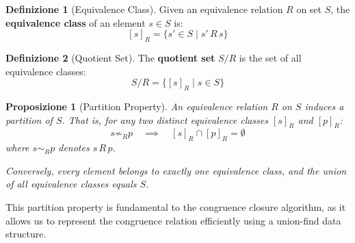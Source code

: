 \documentclass[11pt,a4paper]{article}
\theoremstyle{definition}
\newtheorem{definition}{Definizione}[section]
\theoremstyle{plain}
\newtheorem{proposition}[theorem]{Proposizione}
\theoremstyle{remark}
\begin{document}
\begin{definition}[Equivalence Class]
Given an equivalence relation $R$ on set $S$, the \textbf{equivalence class} of an element $s \in S$ is:
\[
[s]_R = \{s' \in S \mid s' \, R \, s\}
\]
\end{definition}

\begin{definition}[Quotient Set]
The \textbf{quotient set} $S/R$ is the set of all equivalence classes:
\[
S/R = \{[s]_R \mid s \in S\}
\]
\end{definition}

\begin{proposition}[Partition Property]
An equivalence relation $R$ on $S$ induces a partition of $S$. That is, for any two distinct equivalence classes $[s]_R$ and $[p]_R$:
\[
s \not\sim_R p \quad \implies \quad [s]_R \cap [p]_R = \emptyset
\]
where $s \sim_R p$ denotes $s \, R \, p$.

Conversely, every element belongs to exactly one equivalence class, and the union of all equivalence classes equals $S$.
\end{proposition}

This partition property is fundamental to the congruence closure algorithm, as it allows us to represent the congruence relation efficiently using a union-find data structure. 
\end{document}
